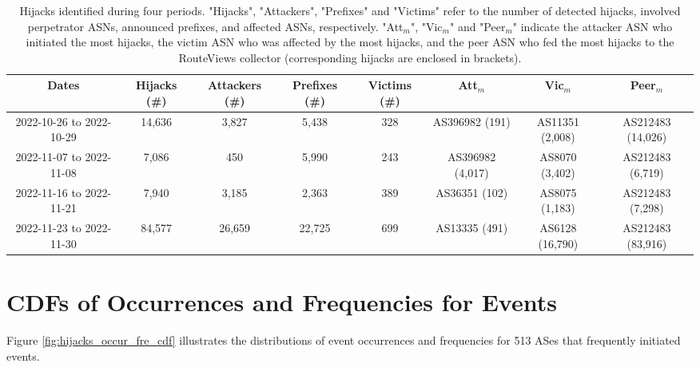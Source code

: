 \begin{table*}[t!]
   \renewcommand{\arraystretch}{1.2}
   \fontsize{8}{8}\selectfont %
  \centering
  \begin {tabular}{cccccccc}
  \toprule
    \textbf{Dates} & \textbf{Hijacks (\#)} & \textbf{Attackers (\#)} & \textbf{Prefixes (\#)} & \textbf{Victims (\#)} & \textbf{Att$_{m}$} & \textbf{Vic$_{m}$} & \textbf{Peer$_{m}$} \\
    \midrule
    
   2022-10-26 to 2022-10-29 & 14,636 & 3,827 & 5,438 & 328 & AS396982 (191) & AS11351 (2,008) & AS212483 (14,026)    \\
    2022-11-07 to 2022-11-08 & 7,086 & 450 & 5,990 & 243 & AS396982 (4,017) & AS8070 (3,402) & AS212483 (6,719)  \\
    2022-11-16 to 2022-11-21 & 7,940 & 3,185 & 2,363 & 389 & AS36351 (102) & AS8075 (1,183) & AS212483 (7,298) \\
    2022-11-23 to 2022-11-30 & 84,577 & 26,659 & 22,725 & 699 & AS13335 (491) & AS6128 (16,790) & AS212483 (83,916)  \\
   \bottomrule
   \end{tabular}
   \caption[Hijacks identified during four surge periods.]{\small Hijacks identified during four periods. "Hijacks", "Attackers", "Prefixes" and "Victims" refer to the number of detected hijacks, involved perpetrator ASNs, announced prefixes, and affected ASNs, respectively. "Att$_{m}$", "Vic$_{m}$" and "Peer$_{m}$" indicate the attacker ASN who initiated the most hijacks, the victim ASN who was affected by the most hijacks, and the peer ASN who fed the most hijacks to the RouteViews collector (corresponding hijacks are enclosed in brackets). %
   }
\label{tab:specific_days_res}
\end{table*}

\section{CDFs of Occurrences and Frequencies for Events}\label{app:CDFs_events} 
Figure \ref{fig:hijacks_occur_fre_cdf} illustrates the distributions of event occurrences and frequencies for 513 ASes
that frequently initiated events.

